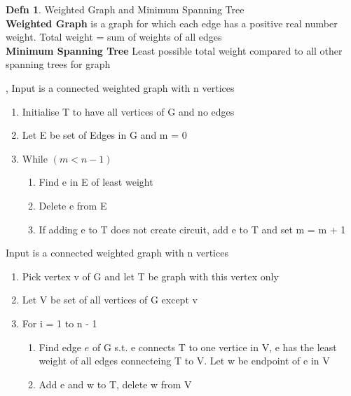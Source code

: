 \documentclass[a4paper]{article}
\theoremstyle{definition}
\newtheorem*{defn}{Defn}
\newenvironment{theorem}[1]
  {\renewcommand\theinnertheorem{#1}\innertheorem}
  {\endinnertheorem}
\begin{document}
\begin{defn} Weighted Graph and Minimum Spanning Tree\\
  \textbf{Weighted Graph} is a graph for which each edge has a positive real number weight. Total weight = sum of weights of all edges\\
  \textbf{Minimum Spanning Tree} Least possible total weight compared to all other spanning trees for graph
\end{defn}

\begin{theorem}{Kruskal's Algorithm}, Input is a connected weighted graph with n vertices
  \begin{enumerate}
    \item Initialise T to have all vertices of G and no edges
    \item Let E be set of Edges in G and m = 0

    \item While $(m < n - 1)$
      \begin{enumerate}
        \item Find e in E of least weight
        \item Delete e from E
        \item If adding e to T does not create circuit, add e to T and set m = m + 1
      \end{enumerate}
  \end{enumerate}
\end{theorem}

\begin{theorem}{Prim's Algorithm}Input is a connected weighted graph with n vertices
  \begin{enumerate}
    \item Pick vertex v of G and let T be graph with this vertex only
    \item Let V be set of all vertices of G except v
    \item For i = 1 to n - 1
      \begin{enumerate}
        \item Find edge $e$ of G s.t. e connects T to one vertice in V, e has the least weight of all edges connecteing T to V. Let w be endpoint of e in V
        \item Add e and w to T, delete w from V
      \end{enumerate}
  \end{enumerate}
\end{theorem}
\end{document}
